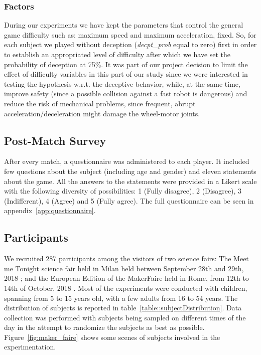 \subsubsection{Factors}
During our experiments we have kept the parameters that control the general game difficulty such as: maximum speed and maximum acceleration, fixed. So, for each subject we played without deception (\textit{decpt\_prob} equal to zero) first in order to establish an appropriated level of difficulty after which we have set the probability of deception at 75\%. It was part of our project decision to limit the effect of difficulty variables in this part of our study since we were interested in testing the hypothesis w.r.t. the deceptive behavior, while, at the same time, improve safety (since a possible collision against a fast robot is dangerous) and reduce the risk of mechanical problems, since frequent, abrupt acceleration/deceleration might damage the wheel-motor joints.

\subsection{Post-Match Survey}

After every match, a questionnaire was administered to each player. It included few questions about the subject (including age and gender) and eleven statements about the game. All the answers to the statements were provided in a Likert scale with the following diversity of possibilities: 1 (Fully disagree), 2 (Disagree), 3 (Indifferent), 4 (Agree) and 5 (Fully agree). The full questionnaire can be seen in appendix~\ref{app:questionnaire}. 

\subsection{Participants}
We recruited 287 participants among the visitors of two science fairs: The Meet me Tonight science fair held in Milan held between September 28th and 29th, 2018%
; and the European Edition of the MakerFaire held in Rome, from 12th to 14th of October, 2018%
. Most of the experiments were conducted with children, spanning from 5 to 15 years old, with a few adults from 16 to 54 years. The distribution of subjects is reported in table~\ref{table::subjectDistribution}. Data collection was performed with subjects being sampled on different times of the day in the attempt to randomize the subjects as best as possible. Figure~\ref{fig:maker_faire} shows some scenes of subjects involved in the experimentation.

